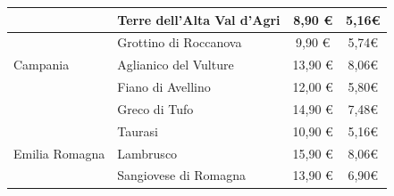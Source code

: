 \documentclass[12pt, a4paper]{article}
\begin{document}
\begin{longtable}{@{}|l|l|c|c|}
                         & Terre dell'Alta Val d'Agri                                                & 8,90 €                                                          & 5,16€                                                                                                         \\ \hline
                         & Grottino di Roccanova                                                     & 9,90 €                                                          & 5,74€                                                                                                         \\ \hline
    Campania             & Aglianico del Vulture                                                     & 13,90 €                                                         & 8,06€                                                                                                         \\ \hline
                         & Fiano di Avellino                                                         & 12,00 €                                                         & 5,80€                                                                                                         \\ \hline
                         & Greco di Tufo                                                             & 14,90 €                                                         & 7,48€                                                                                                         \\ \hline
                         & Taurasi                                                                   & 10,90 €                                                         & 5,16€                                                                                                         \\ \hline
    Emilia Romagna       & Lambrusco                                                                 & 15,90 €                                                         & 8,06€                                                                                                         \\ \hline
                         & Sangiovese di Romagna                                                     & 13,90 €                                                         & 6,90€                                                                                                         \\ \hline

\end{longtable}
\end{document}
